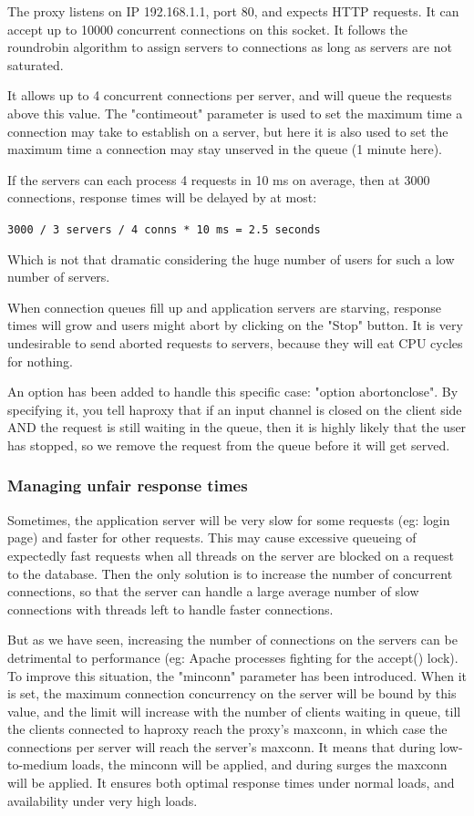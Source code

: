 The proxy listens on IP 192.168.1.1, port 80, and expects HTTP requests. It
can accept up to 10000 concurrent connections on this socket. It follows the
roundrobin algorithm to assign servers to connections as long as servers are
not saturated.

It allows up to 4 concurrent connections per server, and will queue the
requests above this value. The "contimeout" parameter is used to set the
maximum time a connection may take to establish on a server, but here it
is also used to set the maximum time a connection may stay unserved in the
queue (1 minute here).

If the servers can each process 4 requests in 10 ms on average, then at 3000
connections, response times will be delayed by at most:

   \verb|3000 / 3 servers / 4 conns * 10 ms = 2.5 seconds|

Which is not that dramatic considering the huge number of users for such a low
number of servers.

When connection queues fill up and application servers are starving, response
times will grow and users might abort by clicking on the "Stop" button. It is
very undesirable to send aborted requests to servers, because they will eat
CPU cycles for nothing.

An option has been added to handle this specific case: "option abortonclose".
By specifying it, you tell haproxy that if an input channel is closed on the
client side AND the request is still waiting in the queue, then it is highly
likely that the user has stopped, so we remove the request from the queue
before it will get served.

\subsubsection{Managing unfair response times}

Sometimes, the application server will be very slow for some requests (eg:
login page) and faster for other requests. This may cause excessive queueing
of expectedly fast requests when all threads on the server are blocked on a
request to the database. Then the only solution is to increase the number of
concurrent connections, so that the server can handle a large average number
of slow connections with threads left to handle faster connections.

But as we have seen, increasing the number of connections on the servers can
be detrimental to performance (eg: Apache processes fighting for the accept()
lock). To improve this situation, the "minconn" parameter has been introduced.
When it is set, the maximum connection concurrency on the server will be bound
by this value, and the limit will increase with the number of clients waiting
in queue, till the clients connected to haproxy reach the proxy's maxconn, in
which case the connections per server will reach the server's maxconn. It means
that during low-to-medium loads, the minconn will be applied, and during surges
the maxconn will be applied. It ensures both optimal response times under
normal loads, and availability under very high loads.

